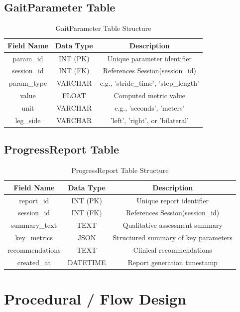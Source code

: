 \documentclass[12pt,a4paper]{report}
\begin{document}
\subsection*{GaitParameter Table}

\begin{table}[H]
\centering
\caption{GaitParameter Table Structure}
\begin{tabular}{|c|c|c|}
\hline
\textbf{Field Name} & \textbf{Data Type} & \textbf{Description} \\
\hline
param\_id & INT (PK) & Unique parameter identifier \\
session\_id & INT (FK) & References Session(session\_id) \\
param\_type & VARCHAR & e.g., 'stride\_time', 'step\_length' \\
value & FLOAT & Computed metric value \\
unit & VARCHAR & e.g., 'seconds', 'meters' \\
leg\_side & VARCHAR & 'left', 'right', or 'bilateral' \\
\hline
\end{tabular}
\end{table}

\subsection*{ProgressReport Table}

\begin{table}[H]
\centering
\caption{ProgressReport Table Structure}
\begin{tabular}{|c|c|c|}
\hline
\textbf{Field Name} & \textbf{Data Type} & \textbf{Description} \\
\hline
report\_id & INT (PK) & Unique report identifier \\
session\_id & INT (FK) & References Session(session\_id) \\
summary\_text & TEXT & Qualitative assessment summary \\
key\_metrics & JSON & Structured summary of key parameters \\
recommendations & TEXT & Clinical recommendations \\
created\_at & DATETIME & Report generation timestamp \\
\hline
\end{tabular}
\end{table}

\section{Procedural / Flow Design}
\end{document}
